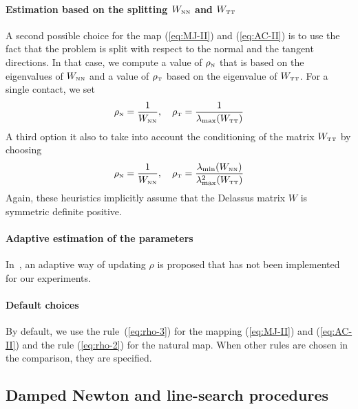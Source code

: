 \paragraph{Estimation based on the splitting  $W_{{\hbox{\tiny{N}}}{\hbox{\tiny{N}}}}$ and $W_{{\hbox{\tiny{T}}}{\hbox{\tiny{T}}}}$} A second possible choice for the map  (\ref{eq:MJ-II}) and (\ref{eq:AC-II}) is to use the fact that the problem is split with respect to the normal and the tangent directions. In that case, we compute a value of $\rho_{\hbox{\tiny{N}}}$ that is based on the eigenvalues of $W_{{\hbox{\tiny{N}}}{\hbox{\tiny{N}}}}$ and a value of $\rho_{\hbox{\tiny{T}}}$ based on the eigenvalue of $W_{{\hbox{\tiny{T}}}{\hbox{\tiny{T}}}}$. For a single contact, we set
\begin{equation}
  \label{eq:rho-3}
  \rho_\n = \frac 1 {W_{\n\n}}, \quad \rho_\t = \frac{1}{\lambda_{\max}(W_{\t\t})}
\end{equation}
A third option it also to take into account the conditioning of the matrix $W_{{\hbox{\tiny{T}}}{\hbox{\tiny{T}}}}$ by choosing
\begin{equation}
  \label{eq:rho-4}
  \rho_\n = \frac 1 {W_{\n\n}}, \quad \rho_\t = \frac{\lambda_{\min}(W_{\n\n})}{\lambda^2_{\max}(W_{\t\t})}
\end{equation}
Again, these heuristics implicitly assume that the Delassus matrix $W$ is symmetric definite positive.
\paragraph{Adaptive estimation of the parameters} In~\cite{Koziara.Bicanic_CMAME2008}, an adaptive way of updating $\rho$ is proposed that has not been implemented for our experiments.

\paragraph{Default choices} By default, we use the rule~(\ref{eq:rho-3}) for the mapping  (\ref{eq:MJ-II}) and (\ref{eq:AC-II}) and the rule  (\ref{eq:rho-2}) for the natural map. When other rules are chosen in the comparison, they are specified.


\subsection{Damped Newton and line-search procedures}

